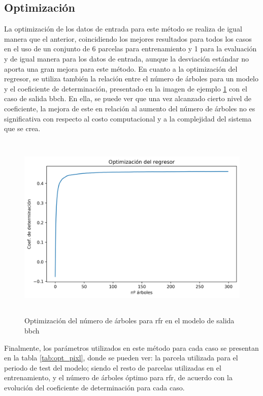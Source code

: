 \subsection{Optimización}
\par La optimización de los datos de entrada para este método se realiza de igual manera que el anterior, coincidiendo los mejores resultados para todos los casos en el uso de un conjunto de 6 parcelas para entrenamiento y 1 para la evaluación y de igual manera para los datos de entrada, aunque la desviación estándar no aporta una gran mejora para este método. En cuanto a la optimización del regresor, se utiliza también la relación entre el número de árboles para un modelo y el coeficiente de determinación, presentado en la imagen de ejemplo \ref{fig:opt_pixl} con el caso de salida \gls{bbch}. En ella, se puede ver que una vez alcanzado cierto nivel de coeficiente, la mejora de este en relación al aumento del número de árboles no es significativa con respecto al costo computacional y a la complejidad del sistema que se crea. 
\begin{figure}[h]
    \centering
    \includegraphics[height=9cm]{archivos/tfg/Pixel/opt_tree_bbch_pixel} 
    \caption{Optimización del número de árboles para \gls{rfr} en el modelo de salida \gls{bbch}}
    \label{fig:opt_pixl}
\end{figure}

\par Finalmente, los parámetros utilizados en este método para cada caso se presentan en la tabla \ref{tab:opt_pixl}, donde se pueden ver: la parcela utilizada para el periodo de test del modelo; siendo el resto de parcelas utilizadas en el entrenamiento, y el número de árboles óptimo para \gls{rfr}, de acuerdo con la evolución del coeficiente de determinación para cada caso.

